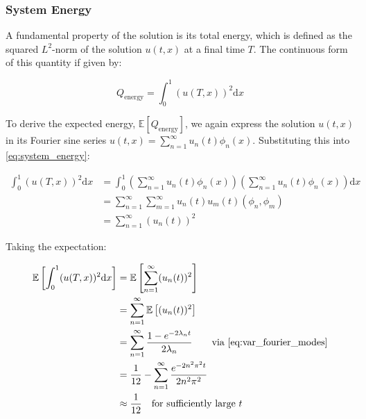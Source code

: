 \subsubsection{System Energy}

A fundamental property of the solution is its total energy, which is defined 
as the squared $L^2$-norm of the solution $u(t,x)$ at a final time $T$. The 
continuous form of this quantity if given by:

\begin{equation}\label{eq:system_energy}
    Q_{\text{energy}} = \int_0^1 (u(T,x))^2 \mathrm{d}x
\end{equation}

To derive the expected energy, $\mathbb{E}[Q_{\text{energy}}]$, 
we again express the solution 
$u(t,x)$ in its Fourier sine series
$u(t,x) = \sum_{n=1}^\infty u_n(t)\phi_n(x)$. Substituting this into 
\eqref{eq:system_energy}:

\begin{align*}
    \int_0^1 (u(T,x))^2 \mathrm{d}x &= 
    \int_0^1\left(\sum_{n=1}^\infty u_n(t)\phi_n(x)\right)
    \left(\sum_{n=1}^\infty u_n(t)\phi_n(x)\right) \mathrm{d}x \\
    &= \sum_{n=1}^\infty \sum_{m=1}^\infty u_n(t) u_m(t) (\phi_n, \phi_m) \\
    &= \sum_{n=1}^\infty (u_n(t))^2
\end{align*}

Taking the expectation:

\begin{align*}
    \mathbb{E}\left[\int_0^1 (u(T,x))^2 \mathrm{d}x\right] &= 
    \mathbb{E}\left[\sum_{n=1}^\infty (u_n(t))^2\right] \\
    &= \sum_{n=1}^\infty \mathbb{E}\left[(u_n(t))^2\right] \\
    &= \sum_{n=1}^\infty \frac{1-e^{-2\lambda_n t}}{2\lambda_n}
    \qquad \text{via } \eqref{eq:var_fourier_modes}\\
    &= \frac{1}{12} - \sum_{n=1}^\infty \frac{e^{-2n^2 \pi^2 t}}{2 n^2 \pi^2}\\
    &\approx \frac{1}{12} \quad \text{for sufficiently large } t
\end{align*}
